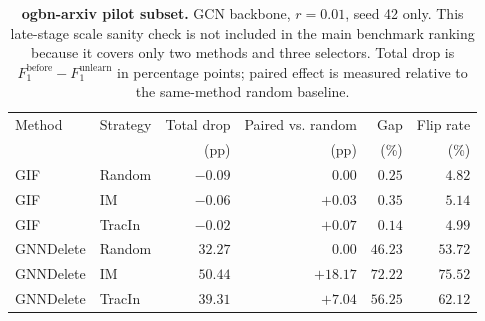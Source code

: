 \begin{table}[t]
\centering
\footnotesize
\setlength{\tabcolsep}{5pt}
\caption{\textbf{ogbn-arxiv pilot subset.}
GCN backbone, $r{=}0.01$, seed 42 only. This late-stage scale sanity
check is not included in the main benchmark ranking because it covers
only two methods and three selectors. Total drop is
$F_1^{\mathrm{before}}-F_1^{\mathrm{unlearn}}$ in percentage points;
paired effect is measured relative to the same-method random baseline.}
\label{tab:arxiv-pilot}
\begin{tabular}{llrrrr}
\toprule
Method & Strategy & Total drop & Paired vs. random & Gap & Flip rate \\
       &          & (pp)       & (pp)              & (\%) & (\%) \\
\midrule
GIF       & Random & $-0.09$ & $0.00$   & $0.25$ & $4.82$ \\
GIF       & IM     & $-0.06$ & $+0.03$  & $0.35$ & $5.14$ \\
GIF       & TracIn & $-0.02$ & $+0.07$  & $0.14$ & $4.99$ \\
\midrule
GNNDelete & Random & $32.27$ & $0.00$   & $46.23$ & $53.72$ \\
GNNDelete & IM     & $50.44$ & $+18.17$ & $72.22$ & $75.52$ \\
GNNDelete & TracIn & $39.31$ & $+7.04$  & $56.25$ & $62.12$ \\
\bottomrule
\end{tabular}
\end{table}

